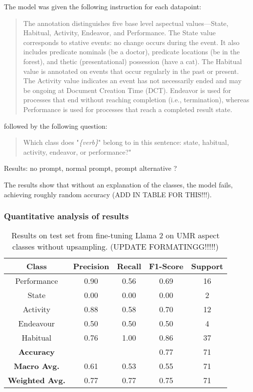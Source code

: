 The model was given the following instruction for each datapoint:
\begin{quotation}
    The annotation distinguishes five base level aspectual values—State, Habitual, Activity, Endeavor, and Performance. The State value corresponds to stative events: no change occurs during the event. It also includes predicate nominals (be a doctor), predicate locations (be in the forest), and thetic (presentational) possession (have a cat). The Habitual value is annotated on events that occur regularly in the past or present. The Activity value indicates an event has not necessarily ended and may be ongoing at Document Creation Time (DCT). Endeavor is used for processes that end without reaching completion (i.e., termination), whereas Performance is used for processes that reach a completed result state. 
\end{quotation}
followed by the following question:
\begin{quotation}
    Which class does "\emph{\{verb\}}" belong to in this sentence: state, habitual, activity, endeavor, or performance?"
\end{quotation}

Results: no prompt, normal prompt, prompt alternative ?

The results show that without an explanation of the classes, the model fails, achieving roughly random accuracy (ADD IN TABLE FOR THIS!!!). 

\subsubsection*{Quantitative analysis of results}

\begin{table}
    \centering
    \begin{tabular}{|c|c|c|c|c|}\hline
        Class & Precision & Recall & F1-Score & Support \\ \hline
        Performance & 0.90 & 0.56 & 0.69 & 16\\ \hline
        State & 0.00 & 0.00 & 0.00 & 2\\\hline
        Activity & 0.88 & 0.58 & 0.70 & 12\\\hline
        Endeavour & 0.50 & 0.50 & 0.50 & 4\\\hline
        Habitual & 0.76 & 1.00 & 0.86 & 37\\ \hline \hline
        \textbf{Accuracy} &  &  & 0.77 & 71 \\ \hline
        \textbf{Macro Avg.} & 0.61  & 0.53 & 0.55 & 71 \\ \hline
        \textbf{Weighted Avg.} & 0.77  & 0.77 & 0.75 & 71 \\ \hline

    \end{tabular}
    \caption{Results on test set from fine-tuning Llama 2 on UMR aspect classes without upsampling. (UPDATE FORMATINGG!!!!!)}
\end{table}
\label{llama_results_no_upsampling}

